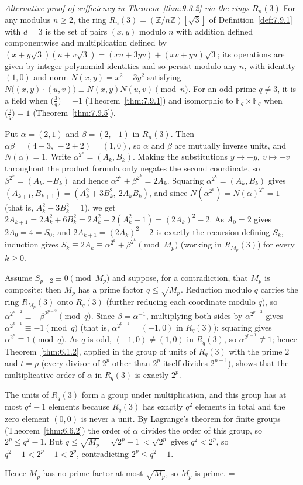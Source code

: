 \documentclass[11pt]{article}
\makeatletter
\theoremstyle{ntstyle}
\let\nt@closedisplay\]
\def\nt@guardedclose{\@ifnextchar\par{\nt@closeafterpar}{\@ifnextchar\end{\postdisplaypenalty\@M\nt@closedisplay}{\nt@closedisplay}}}
\def\nt@closeafterpar\par{\@ifnextchar\par{\nt@closeafterpar}{\@ifnextchar\end{\postdisplaypenalty\@M\nt@closedisplay\par}{\nt@closedisplay\par}}}
\renewenvironment{proof}[1][\proofname]{\par
  \pushQED{\qed}\normalfont\topsep\medskipamount\edef\nt@afterproof{\@endparpenalty=\the\@endparpenalty\relax}\@beginparpenalty\@M\@endparpenalty\@M\let\]\nt@guardedclose\trivlist\item[]\textit{#1\@addpunct{.}} \ignorespaces}{\ifvmode\addpenalty\@M\fi\popQED\nt@afterproof\endtrivlist\@endpefalse}
\newenvironment{altproof}[1][\proofname]{\begin{proof}[#1]}{\end{proof}}
\newcommand{\legs}[2]{\bigl(\tfrac{#1}{#2}\bigr)}
\makeatother
\begin{document}
\begin{altproof}[Alternative proof of sufficiency in Theorem~\ref{thm:9.3.2} via the rings $R_n(3)$]
	For any modulus $n\ge2$, the ring
	$R_n(3)=(\mathbb{Z}/n\mathbb{Z})[\sqrt{3}]$ of
	Definition~\ref{def:7.9.1} with $d=3$ is the set of pairs $(x,y)$ modulo
	$n$ with addition defined componentwise and multiplication defined by
	$(x+y\sqrt{3})(u+v\sqrt{3})=(xu+3yv)+(xv+yu)\sqrt{3}$; its operations
	are given by integer polynomial identities and so persist modulo any $n$, with
	identity $(1,0)$ and norm $N(x,y)=x^{2}-3y^{2}$ satisfying
	$N\big((x,y)\cdot(u,v)\big)\equiv N(x,y)N(u,v)\pmod{n}$. For an odd prime
	$q\neq3$, it is a field when $\legs{3}{q}=-1$
	(Theorem~\ref{thm:7.9.1}) and isomorphic to
	$\mathbb{F}_q\times\mathbb{F}_q$ when
	$\legs{3}{q}=1$ (Theorem~\ref{thm:7.9.5}).

	Put $\alpha=(2,1)$ and $\beta=(2,-1)$ in $R_n(3)$. Then
	$\alpha\beta=(4-3,\,-2+2)=(1,0)$, so $\alpha$ and $\beta$ are
	mutually inverse units, and $N(\alpha)=1$. Write
	$\alpha^{2^k}=(A_k,B_k)$. Making the substitutions $y\mapsto-y,\ v\mapsto-v$
	throughout the product formula only negates the second coordinate, so
	$\beta^{2^k}=(A_k,-B_k)$ and hence $\alpha^{2^k}+\beta^{2^k}=2A_k$.
	Squaring $\alpha^{2^k}=(A_k,B_k)$ gives $(A_{k+1},B_{k+1})=(A_k^2+3B_k^2,\ 2A_kB_k)$, and
	since $N(\alpha^{2^k})=N(\alpha)^{2^k}=1$ (that is, $A_k^2-3B_k^2=1$),
	we get $2A_{k+1}=2A_k^2+6B_k^2=2A_k^2+2(A_k^2-1)=(2A_k)^2-2$. As $A_0=2$
	gives $2A_0=4=S_0$, and $2A_{k+1}=(2A_k)^2-2$ is exactly the
	recursion defining $S_k$, induction gives
	$S_k\equiv2A_k\equiv\alpha^{2^k}+\beta^{2^k}\pmod{M_p}$ (working in
	$R_{M_p}(3)$) for every $k\ge0$.

	Assume $S_{p-2}\equiv0\pmod{M_p}$ and suppose, for a contradiction,
	that $M_p$ is composite; then $M_p$ has a prime factor
	$q\le\sqrt{M_p}$. Reduction modulo $q$ carries the ring $R_{M_p}(3)$ onto
	$R_q(3)$ (further reducing each coordinate modulo $q$), so
	$\alpha^{2^{p-2}}\equiv-\beta^{2^{p-2}}\pmod{q}$. Since
	$\beta=\alpha^{-1}$, multiplying both sides by $\alpha^{2^{p-2}}$
	gives $\alpha^{2^{p-1}}\equiv-1\pmod{q}$ (that is, $\alpha^{2^{p-1}}=(-1,0)$ in $R_q(3)$); squaring gives
	$\alpha^{2^{p}}\equiv1\pmod{q}$. As $q$ is odd, $(-1,0)\neq(1,0)$ in
	$R_q(3)$, so $\alpha^{2^{p-1}}\not\equiv1$; hence Theorem~\ref{thm:6.1.2}, applied in the group
	of units of $R_q(3)$ with the prime $2$ and $t=p$ (every divisor of $2^p$
	other than $2^p$ itself divides $2^{p-1}$), shows that the multiplicative
	order of $\alpha$ in $R_q(3)$ is exactly $2^p$.

	The units of $R_q(3)$ form a group under multiplication, and this group has at most
	$q^2-1$ elements because $R_q(3)$ has exactly $q^2$ elements in total
	and the zero element $(0,0)$ is never a unit. By Lagrange's theorem for finite groups (Theorem~\ref{thm:6.6.2})
	the order of $\alpha$ divides the order of this group, so $2^p\le
		q^2-1$. But $q\le\sqrt{M_p}=\sqrt{2^p-1}<\sqrt{2^p}$ gives $q^2<2^p$,
	so $q^2-1<2^p-1<2^p$, contradicting $2^p\le q^2-1$.

	Hence $M_p$ has no prime factor at most $\sqrt{M_p}$, so $M_p$ is prime.
\end{altproof}
\end{document}
